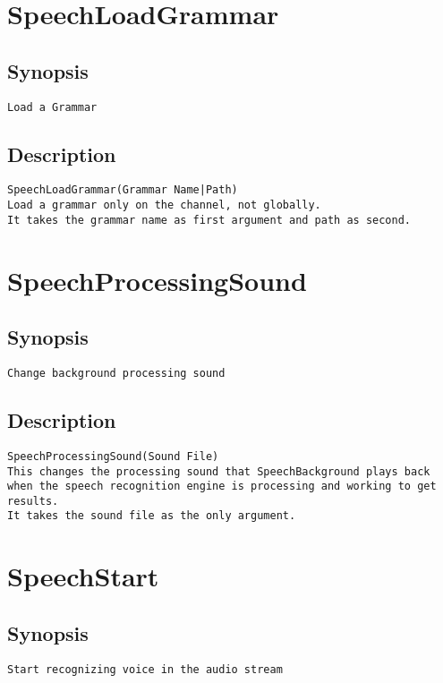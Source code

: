 \section{SpeechLoadGrammar}
\subsection{Synopsis}
\begin{verbatim}
Load a Grammar
\end{verbatim}
\subsection{Description}
\begin{verbatim}
SpeechLoadGrammar(Grammar Name|Path)
Load a grammar only on the channel, not globally.
It takes the grammar name as first argument and path as second.

\end{verbatim}


\section{SpeechProcessingSound}
\subsection{Synopsis}
\begin{verbatim}
Change background processing sound
\end{verbatim}
\subsection{Description}
\begin{verbatim}
SpeechProcessingSound(Sound File)
This changes the processing sound that SpeechBackground plays back when the speech recognition engine is processing and working to get results.
It takes the sound file as the only argument.

\end{verbatim}


\section{SpeechStart}
\subsection{Synopsis}
\begin{verbatim}
Start recognizing voice in the audio stream
\end{verbatim}
